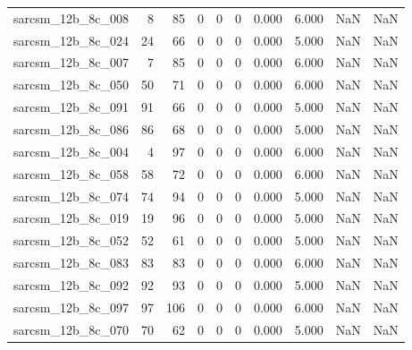 \documentclass{article}
\begin{document}
\begin{longtable}{lrrrrrrrrr}
sarcsm\_12b\_8c\_008 & 8 & 85 & 0 & 0 & 0 & 0.000 & 6.000 & NaN & NaN \\
sarcsm\_12b\_8c\_024 & 24 & 66 & 0 & 0 & 0 & 0.000 & 5.000 & NaN & NaN \\
sarcsm\_12b\_8c\_007 & 7 & 85 & 0 & 0 & 0 & 0.000 & 6.000 & NaN & NaN \\
sarcsm\_12b\_8c\_050 & 50 & 71 & 0 & 0 & 0 & 0.000 & 6.000 & NaN & NaN \\
sarcsm\_12b\_8c\_091 & 91 & 66 & 0 & 0 & 0 & 0.000 & 5.000 & NaN & NaN \\
sarcsm\_12b\_8c\_086 & 86 & 68 & 0 & 0 & 0 & 0.000 & 5.000 & NaN & NaN \\
sarcsm\_12b\_8c\_004 & 4 & 97 & 0 & 0 & 0 & 0.000 & 6.000 & NaN & NaN \\
sarcsm\_12b\_8c\_058 & 58 & 72 & 0 & 0 & 0 & 0.000 & 6.000 & NaN & NaN \\
sarcsm\_12b\_8c\_074 & 74 & 94 & 0 & 0 & 0 & 0.000 & 5.000 & NaN & NaN \\
sarcsm\_12b\_8c\_019 & 19 & 96 & 0 & 0 & 0 & 0.000 & 5.000 & NaN & NaN \\
sarcsm\_12b\_8c\_052 & 52 & 61 & 0 & 0 & 0 & 0.000 & 5.000 & NaN & NaN \\
sarcsm\_12b\_8c\_083 & 83 & 83 & 0 & 0 & 0 & 0.000 & 6.000 & NaN & NaN \\
sarcsm\_12b\_8c\_092 & 92 & 93 & 0 & 0 & 0 & 0.000 & 5.000 & NaN & NaN \\
sarcsm\_12b\_8c\_097 & 97 & 106 & 0 & 0 & 0 & 0.000 & 6.000 & NaN & NaN \\
sarcsm\_12b\_8c\_070 & 70 & 62 & 0 & 0 & 0 & 0.000 & 5.000 & NaN & NaN \\
\end{longtable}
\end{document}
